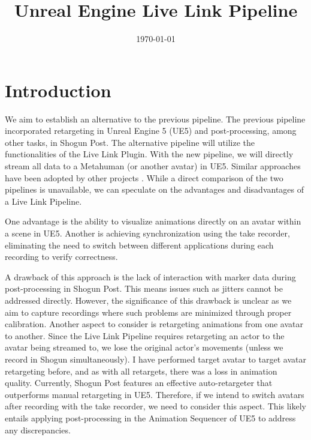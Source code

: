 \documentclass{uva-inf-article}
\title{Unreal Engine Live Link Pipeline}
\date{\today}
\begin{document}
\maketitle
\tableofcontents
\newpage


\section{Introduction}
We aim to establish an alternative to the previous pipeline. The previous pipeline incorporated retargeting in Unreal Engine 5 (UE5) and post-processing, among other tasks, in Shogun Post. The alternative pipeline will utilize the functionalities of the Live Link Plugin. With the new pipeline, we will directly stream all data to a Metahuman (or another avatar) in UE5. Similar approaches have been adopted by other projects \cite{auslan, Kara}. While a direct comparison of the two pipelines is unavailable, we can speculate on the advantages and disadvantages of a Live Link Pipeline.

One advantage is the ability to visualize animations directly on an avatar within a scene in UE5. Another is achieving synchronization using the take recorder, eliminating the need to switch between different applications during each recording to verify correctness.

A drawback of this approach is the lack of interaction with marker data during post-processing in Shogun Post. This means issues such as jitters cannot be addressed directly. However, the significance of this drawback is unclear as we aim to capture recordings where such problems are minimized through proper calibration. Another aspect to consider is retargeting animations from one avatar to another. Since the Live Link Pipeline requires retargeting an actor to the avatar being streamed to, we lose the original actor's movements (unless we record in Shogun simultaneously). I have performed target avatar to target avatar retargeting before, and as with all retargets, there was a loss in animation quality. Currently, Shogun Post features an effective auto-retargeter that outperforms manual retargeting in UE5. Therefore, if we intend to switch avatars after recording with the take recorder, we need to consider this aspect. This likely entails applying post-processing in the Animation Sequencer of UE5 to address any discrepancies.
\end{document}
